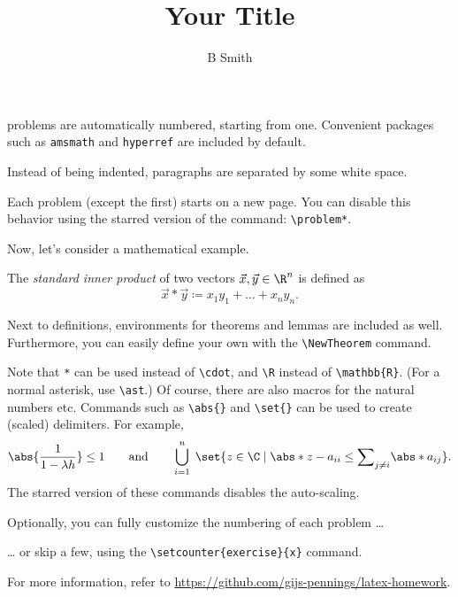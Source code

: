 \documentclass{homework}
\title{Your Title}
\author{B Smith}
\begin{document}
\maketitle
\tableofcontents

\problem
problems are automatically numbered, starting from one. Convenient packages such as \texttt{amsmath} and \texttt{hyperref} are included by default.

Instead of being indented, paragraphs are separated by some white space.


\problem*
Each problem (except the first) starts on a new page. You can disable this behavior using the starred version of the command: \verb|\problem*|.

Now, let's consider a mathematical example.

\begin{definition}
    The \emph{standard inner product} of two vectors $\vec x, \vec y \in \R^n$ is defined as
    \[
        \vec x * \vec y \coloneqq x_1 y_1 + \dots + x_n y_n.
    \]
\end{definition}

Next to definitions, environments for theorems and lemmas are included as well. Furthermore, you can easily define your own with the \verb|\NewTheorem| command.

Note that \texttt{*} can be used instead of \verb|\cdot|, and \verb|\R| instead of \verb|\mathbb{R}|. (For a normal asterisk, use \verb|\ast|.) Of course, there are also macros for the natural numbers etc. Commands such as \verb|\abs{}| and \verb|\set{}| can be used to create (scaled) delimiters. For example,
\[
    \abs{\frac{1}{1 - \lambda h}} \le 1
    \qquad\text{and}\qquad
    \bigcup_{i=1}^n \; \set{z \in \C \mid \abs*{z - a_{ii}} \le {\sum\nolimits_{j \ne i}} \abs*{a_{ij}}}.
\]
The starred version of these commands disables the auto-scaling.

\problem[Rec--2.1]
Optionally, you can fully customize the numbering of each problem \dots{}

\setcounter{exercise}{7}
\problem*
\dots{} or skip a few, using the \verb|\setcounter{exercise}{x}| command.

For more information, refer to \url{https://github.com/gijs-pennings/latex-homework}.
\end{document}
